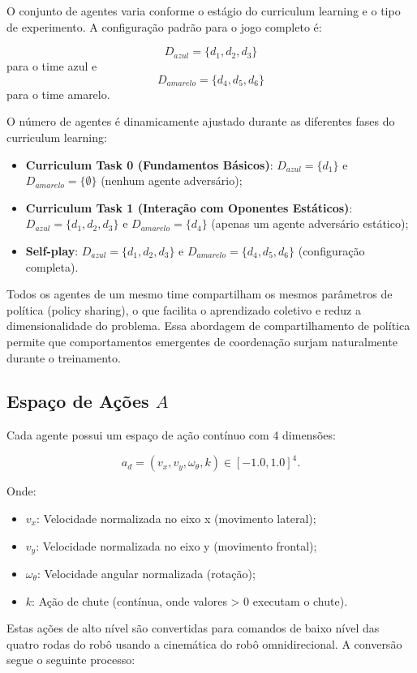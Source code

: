 O conjunto de agentes varia conforme o estágio do curriculum learning e o tipo de experimento. A configuração padrão para o jogo completo é:

$$D_{azul} = \{d_1, d_2, d_3\}$$ para o time azul e $$D_{amarelo} = \{d_4, d_5, d_6\}$$ para o time amarelo.

O número de agentes é dinamicamente ajustado durante as diferentes fases do curriculum learning:

\begin{itemize}
    \item \textbf{Curriculum Task 0 (Fundamentos Básicos)}: $D_{azul} = \{d_1\}$ e $D_{amarelo} = \{\emptyset\}$ (nenhum agente adversário);
    \item \textbf{Curriculum Task 1 (Interação com Oponentes Estáticos)}: $D_{azul} = \{d_1, d_2, d_3\}$ e $D_{amarelo} = \{d_4\}$ (apenas um agente adversário estático);
    \item \textbf{Self-play}: $D_{azul} = \{d_1, d_2, d_3\}$ e $D_{amarelo} = \{d_4, d_5, d_6\}$ (configuração completa).
\end{itemize}

Todos os agentes de um mesmo time compartilham os mesmos parâmetros de política (policy sharing), o que facilita o aprendizado coletivo e reduz a dimensionalidade do problema. Essa abordagem de compartilhamento de política permite que comportamentos emergentes de coordenação surjam naturalmente durante o treinamento.

\subsection{Espaço de Ações $A$}

Cada agente possui um espaço de ação contínuo com 4 dimensões:

$$a_d = (v_x, v_y, \omega_{\theta}, k) \in [-1.0, 1.0]^4.$$

Onde:
\begin{itemize}
    \item $v_x$: Velocidade normalizada no eixo x (movimento lateral);
    \item $v_y$: Velocidade normalizada no eixo y (movimento frontal);
    \item $\omega_{\theta}$: Velocidade angular normalizada (rotação);
    \item $k$: Ação de chute (contínua, onde valores > 0 executam o chute).
\end{itemize}

Estas ações de alto nível são convertidas para comandos de baixo nível das quatro rodas do robô usando a cinemática do robô omnidirecional. A conversão segue o seguinte processo:

